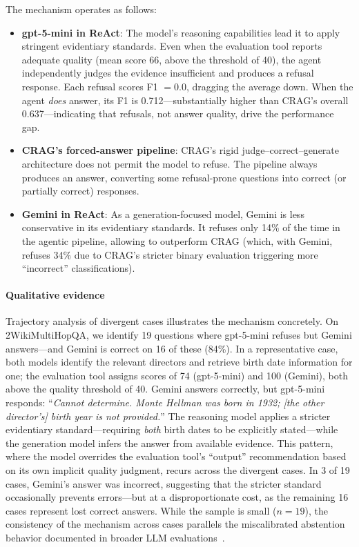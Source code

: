 The mechanism operates as follows:
\begin{itemize}
    \item \textbf{gpt-5-mini in ReAct}: The model's reasoning capabilities lead it to apply stringent evidentiary standards.
    Even when the evaluation tool reports adequate quality (mean score 66, above the threshold of 40), the agent independently judges the evidence insufficient and produces a refusal response.
    Each refusal scores F1 $= 0.0$, dragging the average down.
    When the agent \emph{does} answer, its F1 is 0.712---substantially higher than CRAG's overall 0.637---indicating that refusals, not answer quality, drive the performance gap.

    \item \textbf{CRAG's forced-answer pipeline}: CRAG's rigid judge--correct--generate architecture does not permit the model to refuse.
    The pipeline always produces an answer, converting some refusal-prone questions into correct (or partially correct) responses.

    \item \textbf{Gemini in ReAct}: As a generation-focused model, Gemini is less conservative in its evidentiary standards.
    It refuses only 14\% of the time in the agentic pipeline, allowing \ours{} to outperform CRAG (which, with Gemini, refuses 34\% due to CRAG's stricter binary evaluation triggering more ``incorrect'' classifications).
\end{itemize}

\paragraph{Qualitative evidence}
Trajectory analysis of divergent cases illustrates the mechanism concretely.
On 2WikiMultiHopQA, we identify 19 questions where gpt-5-mini refuses but Gemini answers---and Gemini is correct on 16 of these (84\%).
In a representative case, both models identify the relevant directors and retrieve birth date information for one; the evaluation tool assigns scores of 74 (gpt-5-mini) and 100 (Gemini), both above the quality threshold of 40.
Gemini answers correctly, but gpt-5-mini responds: ``\emph{Cannot determine. Monte Hellman was born in 1932; [the other director's] birth year is not provided.}''
The reasoning model applies a stricter evidentiary standard---requiring \emph{both} birth dates to be explicitly stated---while the generation model infers the answer from available evidence.
This pattern, where the model overrides the evaluation tool's ``output'' recommendation based on its own implicit quality judgment, recurs across the divergent cases.
In 3 of 19 cases, Gemini's answer was incorrect, suggesting that the stricter standard occasionally prevents errors---but at a disproportionate cost, as the remaining 16 cases represent lost correct answers.
While the sample is small ($n = 19$), the consistency of the mechanism across cases parallels the miscalibrated abstention behavior documented in broader LLM evaluations~\cite{kirichenko2025abstentionbench}.

